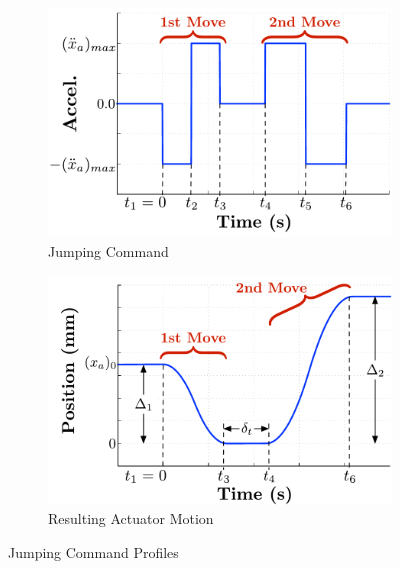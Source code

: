 \begin{figure}[tb!]
\centering
    \begin{subfigure}{0.45\columnwidth}
    \centering
    \includegraphics[width=\columnwidth]{Figures/Ch3/input_shaping/Command_form.pdf}
    \caption{Jumping Command \cite{Vaughan2013}}
    \label{fig:commandForm}
    \end{subfigure}
%
\hspace{0.05\columnwidth} %
%
    \begin{subfigure}{0.45\columnwidth}
    \centering
    \includegraphics[width=\columnwidth]{Figures/Ch3/input_shaping/Jumping_command_position.pdf}
    \caption{Resulting Actuator Motion \cite{Vaughan2013}}
    \label{fig:jumpingCommandPosition}
    \end{subfigure}
\caption{Jumping Command Profiles} %
\label{fig:jumping_commands}	%
\end{figure}
%

